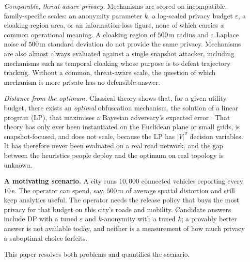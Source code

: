 \documentclass[10pt,journal,compsoc]{IEEEtran}
\begin{document}
\emph{Comparable, threat-aware privacy.} Mechanisms are scored on incompatible,
family-specific scales: an anonymity parameter $k$, a log-scaled privacy budget
$\varepsilon$, a cloaking-region area, or an information-loss figure, none of which
carries a common operational meaning. A cloaking region of $500$\,m radius and a
Laplace noise of $500$\,m standard deviation do not provide the same privacy.
Mechanisms are also almost always evaluated against a single snapshot attacker,
including mechanisms such as temporal cloaking whose purpose is to defeat
trajectory tracking. Without a common, threat-aware scale, the question of which
mechanism is more private has no defensible answer.

\emph{Distance from the optimum.} Classical theory shows that, for a given utility
budget, there exists an \emph{optimal} obfuscation mechanism, the solution of a
linear program (LP), that maximises a Bayesian adversary's expected error
\cite{shokri2012,shokri2015pets,bordenabe2014}. That theory has only ever been
instantiated on the Euclidean plane or small grids, is snapshot-focused, and does
not scale, because the LP has $|V|^2$ decision variables. It has therefore never
been evaluated on a real road network, and the gap between the heuristics people
deploy and the optimum on real topology is unknown.

\smallskip
\noindent\textbf{A motivating scenario.} A city runs $10{,}000$ connected vehicles
reporting every $10$\,s. The operator can spend, say, $500$\,m of average spatial
distortion and still keep analytics useful. The operator needs the release policy
that buys the most privacy for that budget on this city's roads and mobility.
Candidate answers include DP with a tuned $\varepsilon$ and $k$-anonymity with a
tuned $k$; a provably better answer is not available today, and neither is a
measurement of how much privacy a suboptimal choice forfeits.

\smallskip
This paper resolves both problems and quantifies the scenario.
\end{document}
